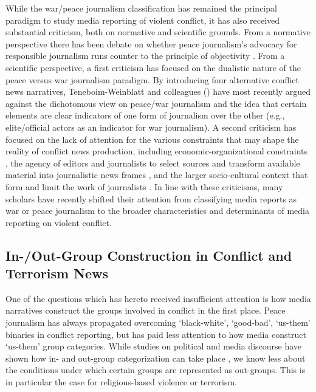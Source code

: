While the war/peace journalism classification has remained the principal paradigm to study media reporting of violent conflict, it has also received substantial criticism, both on normative and scientific grounds. From a normative perspective there has been debate on whether peace journalism's advocacy for responsible journalism runs counter to the principle of objectivity \citep{Loyn2007, Lynch2007}. From a scientific perspective, a first criticism has focused on the dualistic nature of the peace versus war journalism paradigm. By introducing four alternative conflict news narratives, Teneboim-Weinblatt and colleagues (\citeyear{Tenenboim-Weinblatt2016}) have most recently argued against the dichotomous view on peace/war journalism and the idea that certain elements are clear indicators of one form of journalism over the other (e.g., elite/official actors as an indicator for war journalism). A second criticism has focused on the lack of attention for the various constraints that may shape the reality of conflict news production, including economic-organizational constraints \citep[such as the lack of resources, editorial hierarchies, and geographic absence/presence in the field; e.g.,][]{Hanitzsch2007, Hanitzsch2010, Wolfsfeld2004}, the agency of editors and journalists to select sources and transform available material into journalistic news frames \citep{Baden2018a}, and the larger socio-cultural context that form and limit the work of journalists \citep[e.g.,][]{Maslog2006, Zandberg2005}. In line with these criticisms, many scholars have recently shifted their attention from classifying media reports as war or peace journalism to the broader characteristics and determinants of media reporting on violent conflict.


\subsection{In-/Out-Group Construction in Conflict and Terrorism News}
One of the questions which has hereto received insufficient attention is how media narratives construct the groups involved in conflict in the first place. Peace journalism has always propagated overcoming `black-white', `good-bad', `us-them' binaries in conflict reporting, but has paid less attention to how media construct `us-them' group categories. While studies on political and media discourse have shown how in- and out-group categorization can take place \citep[e.g.,][]{Leudar2004, Sowinska2012, vanDijk2006}, we know less about the conditions under which certain groups are represented as out-groups. This is in particular the case for religious-based violence or terrorism. 


